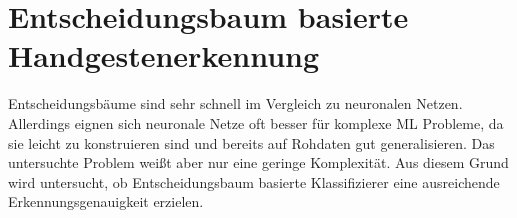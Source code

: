 \chapter{Entscheidungsbaum basierte Handgestenerkennung}
Entscheidungsbäume sind sehr schnell im Vergleich zu neuronalen Netzen. Allerdings eignen sich neuronale Netze oft besser für komplexe ML Probleme, da sie leicht zu konstruieren sind
und bereits auf Rohdaten gut generalisieren. Das untersuchte Problem weißt aber nur eine geringe Komplexität. Aus diesem Grund wird untersucht, ob Entscheidungsbaum basierte Klassifizierer
eine ausreichende Erkennungsgenauigkeit erzielen.




